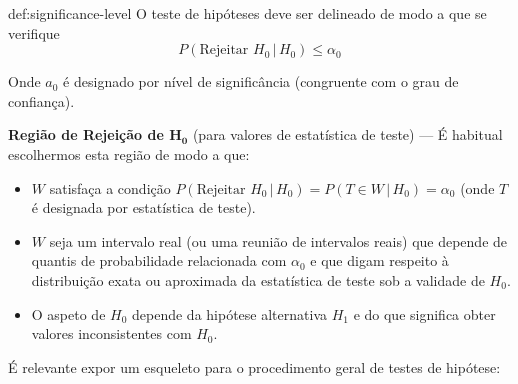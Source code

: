 \vspace{-1em}
\begin{theo}{def:significance-level}\label{def:significance-level}
    \noindent O teste de hipóteses deve ser delineado de modo a que se verifique
    $$
        P(\text{Rejeitar }H_0\,|\, H_0) \leq \alpha_0
    $$

    \noindent Onde $a_0$ é designado por nível de significância (congruente com o grau de confiança).
\end{theo}

\noindent \textbf{Região de Rejeição de $\mathbf{H_0}$} (para valores de estatística de teste) --- É habitual escolhermos esta região de modo a que:

\vspace{0.5em}
\begin{itemize}[nolistsep] \small
    \item $W$ satisfaça a condição $P(\text{Rejeitar }H_0\,|\, H_0) = P(T \in W\,|\, H_0) = \alpha_0$ (onde $T$ é designada por estatística de teste).
    \item $W$ seja um intervalo real (ou uma reunião de intervalos reais) que depende de quantis de probabilidade relacionada com $\alpha_0$ e que digam respeito à distribuição exata ou aproximada da estatística de teste sob a validade de $H_0$.
    \item O aspeto de $H_0$ depende da hipótese alternativa $H_1$ e do que significa obter valores inconsistentes com $H_0$.
\end{itemize}

\newpage
\noindent É relevante expor um esqueleto para o procedimento geral de testes de hipótese:

